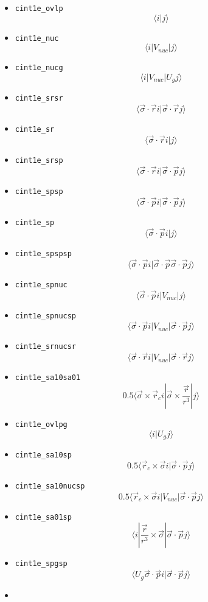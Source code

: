 \documentclass{article}
\begin{document}
\begin{itemize}
\begin{itemize}
  \item
    \verb!cint1e_ovlp! \[\langle  i| j\rangle \]
  \item
    \verb!cint1e_nuc! \[\langle  i| V_{nuc} |j\rangle \]
  \item
    \verb!cint1e_nucg! \[\langle  i| V_{nuc} | U_gj\rangle \]
  \item
    \verb!cint1e_srsr!
    \[\langle \vec{\sigma}\cdot\vec{r} i| \vec{\sigma}\cdot\vec{r}j\rangle \]
  \item
    \verb!cint1e_sr! \[\langle \vec{\sigma}\cdot\vec{r} i|j\rangle \]
  \item
    \verb!cint1e_srsp!
    \[\langle \vec{\sigma}\cdot\vec{r} i| \vec{\sigma}\cdot\vec{p}j\rangle \]
  \item
    \verb!cint1e_spsp!
    \[\langle \vec{\sigma}\cdot\vec{p} i| \vec{\sigma}\cdot\vec{p}j\rangle \]
  \item
    \verb!cint1e_sp! \[\langle \vec{\sigma}\cdot\vec{p} i|j\rangle \]
  \item
    \verb!cint1e_spspsp!
    \[\langle \vec{\sigma}\cdot\vec{p} i| \vec{\sigma}\cdot\vec{p} \vec{\sigma}\cdot\vec{p}j\rangle \]
  \item
    \verb!cint1e_spnuc!
    \[\langle \vec{\sigma}\cdot\vec{p} i| V_{nuc} |j\rangle \]
  \item
    \verb!cint1e_spnucsp!
    \[\langle \vec{\sigma}\cdot\vec{p} i| V_{nuc} | \vec{\sigma}\cdot\vec{p}j\rangle \]
  \item
    \verb!cint1e_srnucsr!
    \[\langle \vec{\sigma}\cdot\vec{r} i| V_{nuc} | \vec{\sigma}\cdot\vec{r}j\rangle \]
  \item
    \verb!cint1e_sa10sa01!
    \[0.5\langle\vec{\sigma} \times \vec{r}_c i|\vec{\sigma} \times \frac{\vec{r}}{r^3} |j\rangle \]
  \item
    \verb!cint1e_ovlpg! \[\langle i|U_g j\rangle \]
  \item
    \verb!cint1e_sa10sp!
    \[0.5\langle\vec{r}_c \times\vec{\sigma} i| \vec{\sigma}\cdot\vec{p}j\rangle \]
  \item
    \verb!cint1e_sa10nucsp!
    \[0.5\langle\vec{r}_c \times\vec{\sigma} i| V_{nuc} | \vec{\sigma}\cdot\vec{p}j\rangle \]
  \item
    \verb!cint1e_sa01sp!
    \[\langle i| \frac{\vec{r}}{r^3} \times\vec{\sigma} | \vec{\sigma}\cdot\vec{p}j\rangle \]
  \item
    \verb!cint1e_spgsp!
    \[\langle U_g \vec{\sigma}\cdot\vec{p} i| \vec{\sigma}\cdot\vec{p}j\rangle \]
  \item

\end{itemize}
\end{itemize}
\end{document}
